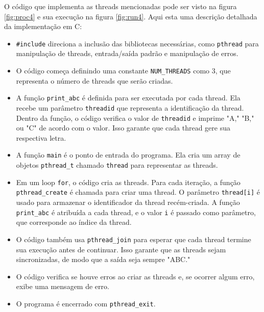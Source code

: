 \documentclass[
	12pt,				%
	openright,			%
	oneside,			%
	a4paper,			%
	chapter=TITLE,		%
	english,			%
	french,				%
	spanish,			%
	brazil				%
	]{abntex2}
\theoremstyle{definition}
\begin{document}
O código que implementa as threads mencionadas pode ser visto na figura \ref{fig:proc4}
e sua execução na figura \ref{fig:run4}. Aqui esta uma descrição detalhada da implementação em C:

\begin{itemize}
    
    \item \texttt{\#include} direciona a inclusão das bibliotecas necessárias, como \texttt{pthread} para manipulação de threads, entrada/saída padrão e manipulação de erros.
    \item O código começa definindo uma constante \texttt{NUM\_THREADS} como 3, que representa o número de threads que serão criadas.
    \item A função \texttt{print\_abc} é definida para ser executada por cada thread. Ela recebe um parâmetro \texttt{threadid} que representa a identificação da thread. Dentro da função, o código verifica o valor de \texttt{threadid} e imprime "A," "B," ou "C" de acordo com o valor. Isso garante que cada thread gere sua respectiva letra.
    \item A função \texttt{main} é o ponto de entrada do programa. Ela cria um array de objetos \texttt{pthread\_t} chamado \texttt{thread} para representar as threads.
    \item Em um loop \texttt{for}, o código cria as threads. Para cada iteração, a função \texttt{pthread\_create} é chamada para criar uma thread. O parâmetro \texttt{thread[i]} é usado para armazenar o identificador da thread recém-criada. A função \texttt{print\_abc} é atribuída a cada thread, e o valor \texttt{i} é passado como parâmetro, que corresponde ao índice da thread. 
    \item O código também usa \texttt{pthread\_join} para esperar que cada thread termine sua execução antes de continuar. Isso garante que as threads sejam sincronizadas, de modo que a saída seja sempre "ABC."
    \item O código verifica se houve erros ao criar as threads e, se ocorrer algum erro, exibe uma mensagem de erro.
    \item O programa é encerrado com \texttt{pthread\_exit}.

\end{itemize}
\end{document}
